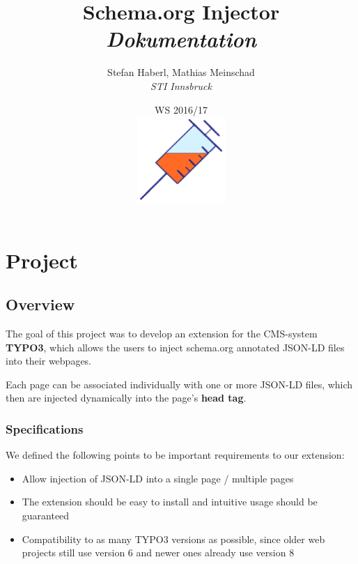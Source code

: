 \documentclass[12pt]{article}
\begin{document}
\title{\textbf{Schema.org Injector} \\ \emph{Dokumentation} }
\author{Stefan Haberl, Mathias Meinschad \\ \emph{STI Innsbruck}}
\date{WS 2016/17 \\ \includegraphics[width=0.25\textwidth, height=0.25\textwidth]{icon.png}}

\maketitle
\newpage

\tableofcontents
\newpage


\section{Project}
\subsection{Overview}
The goal of this project was to develop an extension for the CMS-system \textbf{TYPO3}, which allows the users to inject schema.org annotated JSON-LD files into their webpages.

Each page can be associated individually with one or more JSON-LD files, which then are injected dynamically into the page's \textbf{head tag}.

\subsubsection{Specifications}

	We defined the following points to be important requirements to our extension:
	\begin{itemize}
		\item Allow injection of JSON-LD into a single page / multiple pages
		\item The extension should be easy to install and intuitive usage should be guaranteed
		\item Compatibility to as many TYPO3 versions as possible, since older web projects still use version 6 and newer ones already use version 8
	\end{itemize}
\end{document}
